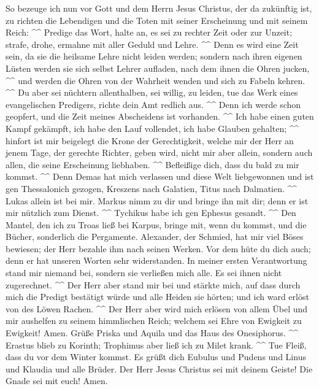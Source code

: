  So bezeuge ich nun vor Gott und dem Herrn Jesus Christus,
der da zukünftig ist, zu richten die Lebendigen und die Toten mit seiner
Erscheinung und mit seinem Reich: \^{}\^{}  Predige das
Wort, halte an, es sei zu rechter Zeit oder zur Unzeit; strafe, drohe,
ermahne mit aller Geduld und Lehre. \^{}\^{}  Denn es wird
eine Zeit sein, da sie die heilsame Lehre nicht leiden werden; sondern
nach ihren eigenen Lüsten werden sie sich selbst Lehrer aufladen, nach
dem ihnen die Ohren jucken, \^{}\^{}  und werden die Ohren
von der Wahrheit wenden und sich zu Fabeln kehren. \^{}\^{}
 Du aber sei nüchtern allenthalben, sei willig, zu leiden,
tue das Werk eines evangelischen Predigers, richte dein Amt redlich aus.
\^{}\^{}  Denn ich werde schon geopfert, und die Zeit
meines Abscheidens ist vorhanden. \^{}\^{}  Ich habe einen
guten Kampf gekämpft, ich habe den Lauf vollendet, ich habe Glauben
gehalten; \^{}\^{}  hinfort ist mir beigelegt die Krone
der Gerechtigkeit, welche mir der Herr an jenem Tage, der gerechte
Richter, geben wird, nicht mir aber allein, sondern auch allen, die
seine Erscheinung liebhaben. \^{}\^{}  Befleißige dich,
dass du bald zu mir kommst. \^{}\^{}  Denn Demas hat mich
verlassen und diese Welt liebgewonnen und ist gen Thessalonich gezogen,
Kreszens nach Galatien, Titus nach Dalmatien. \^{}\^{} 
Lukas allein ist bei mir. Markus nimm zu dir und bringe ihn mit dir;
denn er ist mir nützlich zum Dienst. \^{}\^{}  Tychikus
habe ich gen Ephesus gesandt. \^{}\^{}  Den Mantel, den
ich zu Troas ließ bei Karpus, bringe mit, wenn du kommst, und die
Bücher, sonderlich die Pergamente.  Alexander, der
Schmied, hat mir viel Böses bewiesen; der Herr bezahle ihm nach seinen
Werken.  Vor dem hüte du dich auch; denn er hat unseren
Worten sehr widerstanden.  In meiner ersten Verantwortung
stand mir niemand bei, sondern sie verließen mich alle. Es sei ihnen
nicht zugerechnet. \^{}\^{}  Der Herr aber stand mir bei
und stärkte mich, auf dass durch mich die Predigt bestätigt würde und
alle Heiden sie hörten; und ich ward erlöst von des Löwen Rachen.
\^{}\^{}  Der Herr aber wird mich erlösen von allem Übel
und mir aushelfen zu seinem himmlischen Reich; welchem sei Ehre von
Ewigkeit zu Ewigkeit! Amen.  Grüße Priska und Aquila und
das Haus des Onesiphorus. \^{}\^{}  Erastus blieb zu
Korinth; Trophimus aber ließ ich zu Milet krank. \^{}\^{}
 Tue Fleiß, dass du vor dem Winter kommst. Es grüßt dich
Eubulus und Pudens und Linus und Klaudia und alle Brüder.
 Der Herr Jesus Christus sei mit deinem Geiste! Die Gnade
sei mit euch! Amen.
